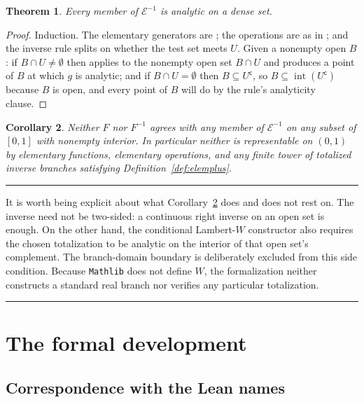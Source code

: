 \documentclass[11pt,oneside]{article}
\newtheorem{theorem}{Theorem}[section]
\newtheorem{corollary}[theorem]{Corollary}
\theoremstyle{definition}
\theoremstyle{remark}
\newcommand{\Elem}{\mathcal E}
\newenvironment{boxedremark}{%
  \par\smallskip\noindent\begin{center}\begin{minipage}{0.94\textwidth}%
  \color{black}\hrule\vspace{0.6em}\small
}{%
  \vspace{0.6em}\hrule\end{minipage}\end{center}\smallskip
}
\begin{document}
\begin{theorem}\label{thm:plusdense}
Every member of $\Elem^{-1}$ is analytic on a dense set.
\end{theorem}

\begin{proof}
Induction.  The elementary generators are ; the operations
are as in ; and the inverse rule splits on whether the test
set meets $U$.  Given a nonempty open $B$: if $B\cap U\ne\emptyset$ then
 applies to the nonempty open set $B\cap U$ and produces a
point of $B$ at which $g$ is analytic; and if $B\cap U=\emptyset$ then
$B\subseteq U^{\mathsf c}$, so
$B\subseteq\operatorname{int}(U^{\mathsf c})$ because $B$ is open, and every
point of $B$ will do by the rule's analyticity clause.
\end{proof}

\begin{corollary}\label{cor:plusmain}
Neither $F$ nor $F^{-1}$ agrees with any member of $\Elem^{-1}$ on any subset
of $[0,1]$ with nonempty interior.  In particular neither is representable on
$(0,1)$ by elementary functions, elementary operations, and any finite tower
of totalized inverse branches satisfying Definition~\ref{def:elemplus}.
\end{corollary}

\begin{boxedremark}
It is worth being explicit about what Corollary~\ref{cor:plusmain} does and does
not rest on.  The inverse need not be two-sided: a continuous right inverse on
an open set is enough.  On the other hand, the conditional Lambert-$W$
constructor also requires the chosen totalization to be analytic on the
interior of that open set's complement.  The branch-domain boundary is
deliberately excluded from this side condition.  Because \texttt{Mathlib} does
not define $W$, the formalization neither constructs a standard real branch
nor verifies any particular totalization.
\end{boxedremark}

\section{The formal development}

\subsection{Correspondence with the Lean names}
\end{document}

